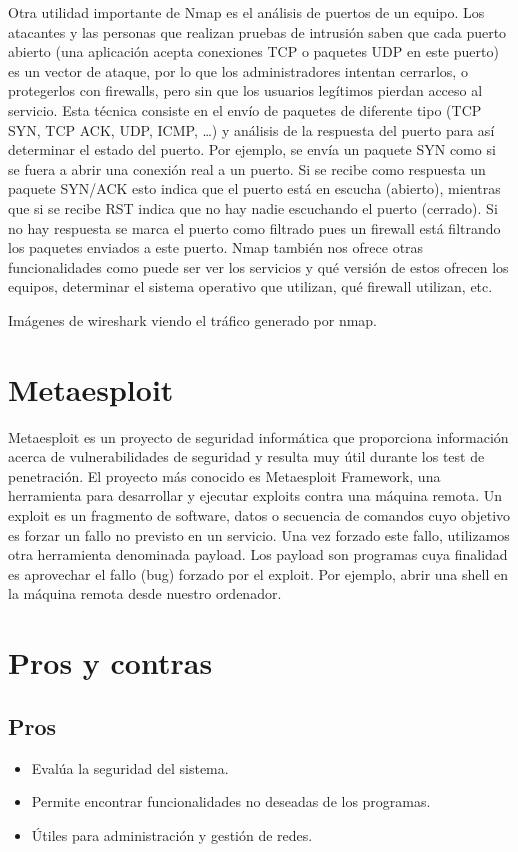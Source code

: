 \documentclass[a4paper, 11pt]{article}
\theoremstyle{plain}
\begin{document}
Otra utilidad importante de Nmap es el análisis de puertos de un equipo. Los atacantes 
y las personas que realizan pruebas de intrusión saben que cada puerto abierto 
(una aplicación acepta conexiones TCP o paquetes UDP en este puerto) es 
un vector de ataque, por lo que los administradores intentan cerrarlos, o protegerlos
con firewalls, pero sin que los usuarios legítimos pierdan acceso al servicio.
Esta técnica consiste en el envío de paquetes de diferente tipo (TCP SYN, TCP ACK, UDP, ICMP, \dots)
y análisis de la respuesta del puerto para así determinar el estado del puerto.
Por ejemplo, se envía un paquete SYN como si se fuera a abrir una conexión real a un puerto.
Si se recibe como respuesta un paquete SYN/ACK esto indica que el puerto está en escucha (abierto),
mientras que si se recibe RST indica que no hay nadie escuchando el puerto (cerrado). Si 
no hay respuesta se marca el puerto como filtrado pues un firewall está filtrando los paquetes
enviados a este puerto.
Nmap también nos ofrece otras funcionalidades como puede ser ver los servicios y qué versión
de estos ofrecen los equipos, determinar el sistema operativo que utilizan, qué 
firewall utilizan, etc.

Imágenes de wireshark viendo el tráfico generado por nmap.

\section{Metaesploit}

Metaesploit es un proyecto de seguridad informática que proporciona información acerca de vulnerabilidades de seguridad y resulta muy útil durante los test de penetración. El proyecto más conocido es Metaesploit Framework, una herramienta para desarrollar y ejecutar exploits contra una máquina remota. Un exploit es un fragmento de software, datos o secuencia de comandos cuyo objetivo es forzar un fallo no previsto en un servicio. Una vez forzado este fallo, utilizamos otra herramienta denominada payload. Los payload son programas cuya finalidad es aprovechar el fallo (bug) forzado por el exploit. Por ejemplo, abrir una shell en la máquina remota desde nuestro ordenador. 

\section{Pros y contras}
\subsection{Pros}
\begin{itemize}
	\item Evalúa la seguridad del sistema.
	\item Permite encontrar funcionalidades no deseadas de los programas.
	\item Útiles para administración y gestión de redes.
\end{itemize}
\end{document}
